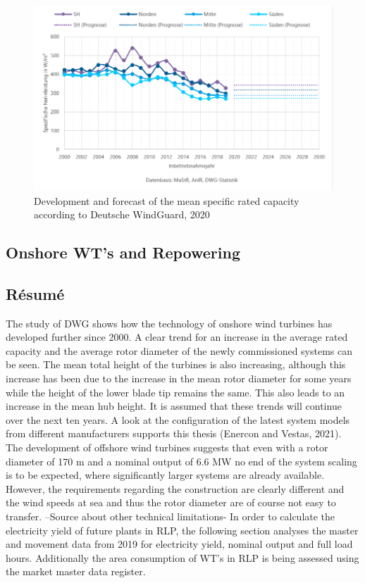 \documentclass[a4paper,11pt]{article}
\begin{document}
\begin{figure}[H]

{\centering \includegraphics[width=1\linewidth]{figures/DWG/DWG_Spezifische_Nennleistung} 

}

\caption{Development and forecast of the mean specific rated capacity according to Deutsche WindGuard, 2020}\label{fig:spec}
\end{figure}
\hypertarget{onshore-wts-and-repowering}{%
\subsection{Onshore WT's and Repowering}\label{onshore-wts-and-repowering}}

\hypertarget{ruxe9sumuxe9}{%
\subsection{Résumé}\label{ruxe9sumuxe9}}

The study of DWG shows how the technology of onshore wind turbines has developed further since 2000. A clear trend for an increase in the average rated capacity and the average rotor diameter of the newly commissioned systems can be seen. The mean total height of the turbines is also increasing, although this increase has been due to the increase in the mean rotor diameter for some years while the height of the lower blade tip remains the same. This also leads to an increase in the mean hub height. It is assumed that these trends will continue over the next ten years. A look at the configuration of the latest system models from different manufacturers supports this thesis (Enercon and Vestas, 2021). The development of offshore wind turbines suggests that even with a rotor diameter of 170 m and a nominal output of 6.6 MW no end of the system scaling is to be expected, where significantly larger systems are already available. However, the requirements regarding the construction are clearly different and the wind speeds at sea and thus the rotor diameter are of course not easy to transfer. --Source about other technical limitations-
In order to calculate the electricity yield of future plants in RLP, the following section analyses the master and movement data from 2019 for electricity yield, nominal output and full load hours. Additionally the area consumption of WT's in RLP is being assessed using the market master data register.
\end{document}
